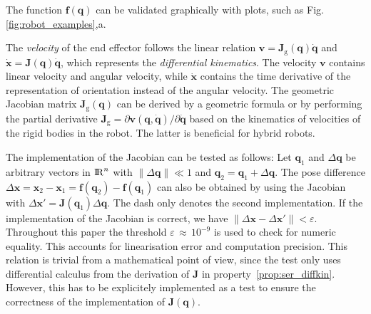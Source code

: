 \documentclass[runningheads]{llncs}
\begin{document}
\begin{test}\label{test:ser_kin}
The function $\bm{f}(\bm{q})$ can be validated graphically with plots, such as Fig.\,\ref{fig:robot_examples},a.
\end{test}


\begin{property}\label{prop:ser_diffkin}
The \emph{velocity} of the end effector follows the linear relation $\bm{v}{=}\bm{J}_\mathrm{g}(\bm{q})\dot{\bm{q}}$ and $\dot{\bm{x}}{=}\bm{J}(\bm{q})\dot{\bm{q}}$, which represents the \emph{differential kinematics}.
The velocity $\bm{v}$ contains linear velocity and angular velocity, while $\dot{\bm{x}}$ contains the time derivative of the representation of orientation instead of the angular velocity.
The geometric Jacobian matrix $\bm{J}_\mathrm{g}(\bm{q})$ can be derived by a geometric formula or by performing the partial derivative $\bm{J}_{\mathrm{g}}{=}\partial \bm{v}(\bm{q},\dot{\bm{q}}) / \partial \dot{\bm{q}}$ based on the kinematics of velocities of the rigid bodies in the robot.
The latter is beneficial for hybrid robots.
\end{property}

\begin{test}\label{test:ser_diffkin}
The implementation of the Jacobian can be tested as follows:
Let $\bm{q}_1$ and $\Delta \bm{q}$ be arbitrary vectors in ${\rm I\!R}^n$ with $\lVert \Delta \bm{q} \rVert \ll 1$ and $\bm{q}_2{=}\bm{q}_1{+}\Delta \bm{q}$.
The pose difference $\Delta \bm{x}{=}\bm{x}_2{-}\bm{x}_1{=}\bm{f}(\bm{q}_2){-}\bm{f}(\bm{q}_1)$ can also be obtained by using the Jacobian with $\Delta \bm{x}'{=}\bm{J}(\bm{q}_1)\Delta \bm{q}$.
The dash only denotes the second implementation.
If the implementation of the Jacobian is correct, we have $\lVert \Delta\bm{x}{-}\Delta\bm{x}'\rVert {<} \varepsilon$.
Throughout this paper the threshold $\varepsilon\,{\approx}\,10^{-9}$ is used to check for numeric equality.
This accounts for linearisation error and computation precision.
This relation is trivial from a mathematical point of view, since the test only uses differential calculus from the derivation of $\bm{J}$ in property~\ref{prop:ser_diffkin}.
However, this has to be explicitely implemented as a test to ensure the correctness of the implementation of $\bm{J}(\bm{q})$.
\end{test}
\end{document}
